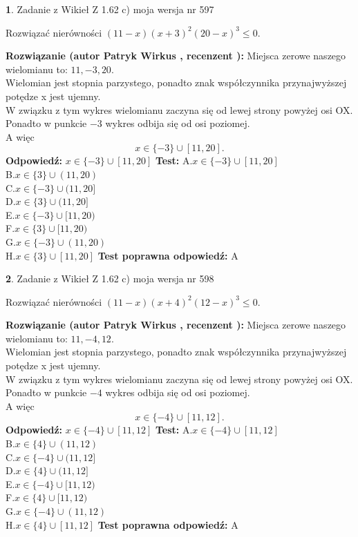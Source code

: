 \documentclass[12pt, a4paper]{article}
\theoremstyle{definition} %
\newtheorem{zad}{}
\newcommand{\zadStart}[1]{\begin{zad}#1\newline}
\newcommand{\zadStop}{\end{zad}}
\newcommand{\rozwStart}[2]{\noindent \textbf{Rozwiązanie (autor #1 , recenzent #2): }\newline}
\newcommand{\rozwStop}{\newline}
\newcommand{\odpStart}{\noindent \textbf{Odpowiedź:}\newline}
\newcommand{\odpStop}{\newline}
\newcommand{\testStart}{\noindent \textbf{Test:}\newline}
\newcommand{\testStop}{\newline}
\newcommand{\kluczStart}{\noindent \textbf{Test poprawna odpowiedź:}\newline}
\newcommand{\kluczStop}{\newline}
\begin{document}
\zadStart{Zadanie z Wikieł Z 1.62 c) moja wersja nr 597}

Rozwiązać nierówności $(11-x)(x+3)^{2}(20-x)^{3}\le0$.
\zadStop
\rozwStart{Patryk Wirkus}{}
Miejsca zerowe naszego wielomianu to: $11, -3, 20$.\\
Wielomian jest stopnia parzystego, ponadto znak współczynnika przy\linebreak najwyższej potędze x jest ujemny.\\ W związku z tym wykres wielomianu zaczyna się od lewej strony powyżej osi OX.\\
Ponadto w punkcie $-3$ wykres odbija się od osi poziomej.\\
A więc $$x \in \{-3\} \cup [11,20].$$
\rozwStop
\odpStart
$x \in \{-3\} \cup [11,20]$
\odpStop
\testStart
A.$x \in \{-3\} \cup [11,20]$\\
B.$x \in \{3\} \cup (11,20)$\\
C.$x \in \{-3\} \cup (11,20]$\\
D.$x \in \{3\} \cup (11,20]$\\
E.$x \in \{-3\} \cup [11,20)$\\
F.$x \in \{3\} \cup [11,20)$\\
G.$x \in \{-3\} \cup (11,20)$\\
H.$x \in \{3\} \cup [11,20]$
\testStop
\kluczStart
A
\kluczStop



\zadStart{Zadanie z Wikieł Z 1.62 c) moja wersja nr 598}

Rozwiązać nierówności $(11-x)(x+4)^{2}(12-x)^{3}\le0$.
\zadStop
\rozwStart{Patryk Wirkus}{}
Miejsca zerowe naszego wielomianu to: $11, -4, 12$.\\
Wielomian jest stopnia parzystego, ponadto znak współczynnika przy\linebreak najwyższej potędze x jest ujemny.\\ W związku z tym wykres wielomianu zaczyna się od lewej strony powyżej osi OX.\\
Ponadto w punkcie $-4$ wykres odbija się od osi poziomej.\\
A więc $$x \in \{-4\} \cup [11,12].$$
\rozwStop
\odpStart
$x \in \{-4\} \cup [11,12]$
\odpStop
\testStart
A.$x \in \{-4\} \cup [11,12]$\\
B.$x \in \{4\} \cup (11,12)$\\
C.$x \in \{-4\} \cup (11,12]$\\
D.$x \in \{4\} \cup (11,12]$\\
E.$x \in \{-4\} \cup [11,12)$\\
F.$x \in \{4\} \cup [11,12)$\\
G.$x \in \{-4\} \cup (11,12)$\\
H.$x \in \{4\} \cup [11,12]$
\testStop
\kluczStart
A
\kluczStop
\end{document}
